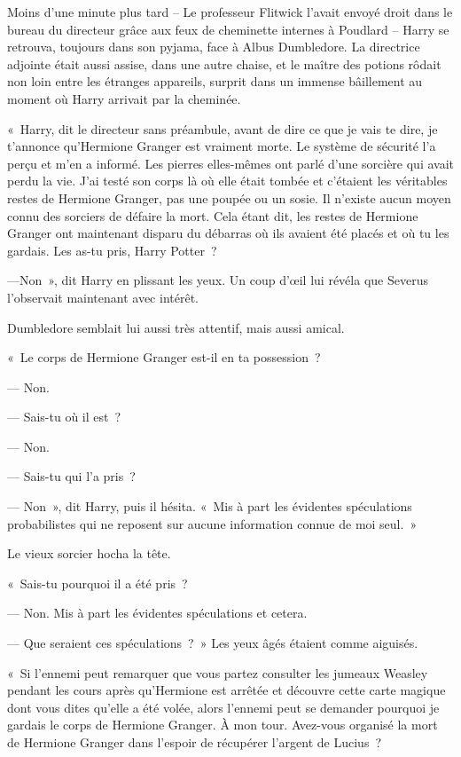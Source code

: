 Moins d'une minute plus tard -- Le professeur Flitwick l'avait envoyé droit dans le bureau du directeur grâce aux feux de cheminette internes à Poudlard -- Harry se retrouva, toujours dans son pyjama, face à Albus Dumbledore.
La directrice adjointe était aussi assise, dans une autre chaise, et le maître des potions rôdait non loin entre les étranges appareils, surprit dans un immense bâillement au moment où Harry arrivait par la cheminée.

«~Harry, dit le directeur sans préambule, avant de dire ce que je vais te dire, je t'annonce qu'Hermione Granger est vraiment morte.
Le système de sécurité l'a perçu et m'en a informé.
Les pierres elles-mêmes ont parlé d'une sorcière qui avait perdu la vie.
J'ai testé son corps là où elle était tombée et c'étaient les véritables restes de Hermione Granger, pas une poupée ou un sosie.
Il n'existe aucun moyen connu des sorciers de défaire la mort.
Cela étant dit, les restes de Hermione Granger ont maintenant disparu du débarras où ils avaient été placés et où tu les gardais.
Les as-tu pris, Harry Potter~?

---Non~», dit Harry en plissant les yeux.
Un coup d'œil lui révéla que Severus l'observait maintenant avec intérêt.

Dumbledore semblait lui aussi très attentif, mais aussi amical.

«~Le corps de Hermione Granger est-il en ta possession~?

--- Non.

--- Sais-tu où il est~?

--- Non.

--- Sais-tu qui l'a pris~?

--- Non~», dit Harry, puis il hésita.
«~Mis à part les évidentes spéculations probabilistes qui ne reposent sur aucune information connue de moi seul.~»

Le vieux sorcier hocha la tête.

«~Sais-tu pourquoi il a été pris~?

--- Non.
Mis à part les évidentes spéculations et cetera.

--- Que seraient ces spéculations~?~»
 Les yeux âgés étaient comme aiguisés.

«~Si l'ennemi peut remarquer que vous partez consulter les jumeaux Weasley pendant les cours après qu'Hermione est arrêtée et découvre cette carte magique dont vous dites qu'elle a été volée, alors l'ennemi peut se demander pourquoi je gardais le corps de Hermione Granger.
À mon tour.
Avez-vous organisé la mort de Hermione Granger dans l'espoir de récupérer l'argent de Lucius~?

